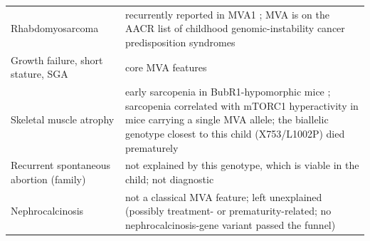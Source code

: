 \documentclass[10pt]{article}
\begin{document}
\begin{table}[H]\tablefont
\begin{tabularx}{\linewidth}{@{}P{3.6cm}L@{}}
\toprule{} & \\\midrule
Rhabdomyosarcoma & recurrently reported in MVA1 \citep{hanks,nishitani}; MVA is on the AACR list of childhood genomic-instability cancer predisposition syndromes \citep{nakano}\\
Growth failure, short stature, SGA & core MVA features\\
Skeletal muscle atrophy & early sarcopenia in BubR1-hypomorphic mice \citep{baker04}; sarcopenia correlated with mTORC1 hyperactivity in mice carrying a single MVA allele; the biallelic genotype closest to this child (X753/L1002P) died prematurely \citep{sieben}\\
Recurrent spontaneous abortion (family) & not explained by this genotype, which is viable in the child; not diagnostic\\
Nephrocalcinosis & not a classical MVA feature; left unexplained (possibly treatment- or prematurity-related; no nephrocalcinosis-gene variant passed the funnel)\\\bottomrule
\end{tabularx}\end{table}
\end{document}
